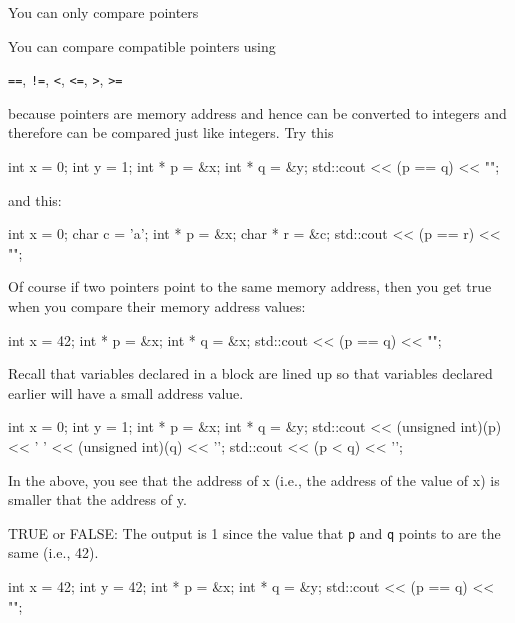 \newpage{}

You can only compare pointers 

You can compare compatible pointers using
\begin{center}
\texttt{==}, \texttt{!=}, \texttt{<}, \texttt{<=}, \texttt{>}, \texttt{>=}
\end{center}
because pointers are memory address and hence can be converted to integers and therefore can be compared just like integers. Try this

\begin{consolethree}[escapeinside=||]
int x = 0;
int y = 1;
int * p = &x;
int * q = &y;
std::cout << (p == q) << "\n";
\end{consolethree}

and this:

\begin{consolethree}[escapeinside=||]
int x = 0;
char c = 'a';
int * p = &x;
char * r = &c;
std::cout << (p == r) << "\n";
\end{consolethree}

Of course if two pointers point to the same memory address, then you get
true when you compare their memory address values:

\begin{consolethree}[escapeinside=||]
int x = 42;
int * p = &x;
int * q = &x;
std::cout << (p == q) << "\n";
\end{consolethree}

Recall that variables declared in a block are lined up so that variables declared earlier will have a small address value.

\begin{consolethree}[escapeinside=||]
int x = 0;
int y = 1;
int * p = &x;
int * q = &y;
std::cout << (unsigned int)(p) << ' '
          << (unsigned int)(q) << '\n';
std::cout << (p < q) << '\n';
\end{consolethree}
In the above, you see that the address of x (i.e., the address of the value of x) is smaller that the address of y.

\begin{ex}
TRUE or FALSE: The output is 1 since the value that \texttt{p} and \texttt{q} points to are the same (i.e., 42).

\begin{consolethree}[escapeinside=||]
int x = 42;
int y = 42;
int * p = &x;
int * q = &y;
std::cout << (p == q) << "\n";
\end{consolethree}
\end{ex}


